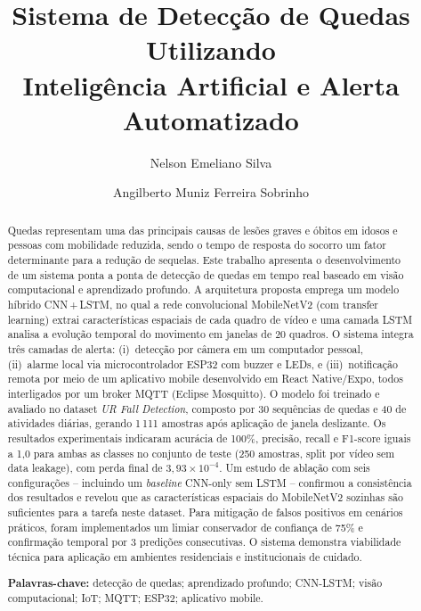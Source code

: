 \documentclass[12pt,a4paper]{article}
\title{\textbf{Sistema de Detecção de Quedas Utilizando\\
Inteligência Artificial e Alerta Automatizado}}
\author[1]{Nelson Emeliano Silva}
\author[1]{Angilberto Muniz Ferreira Sobrinho}
\affil[1]{Universidade do Estado do Amazonas (UEA), Manaus -- AM, Brasil}
\date{}
\begin{document}
\maketitle

\begin{abstract}
Quedas representam uma das principais causas de lesões graves e óbitos em idosos e pessoas com mobilidade reduzida, sendo o tempo de resposta do socorro um fator determinante para a redução de sequelas. Este trabalho apresenta o desenvolvimento de um sistema ponta a ponta de detecção de quedas em tempo real baseado em visão computacional e aprendizado profundo. A arquitetura proposta emprega um modelo híbrido CNN\,+\,LSTM, no qual a rede convolucional MobileNetV2 (com transfer learning) extrai características espaciais de cada quadro de vídeo e uma camada LSTM analisa a evolução temporal do movimento em janelas de 20 quadros. O sistema integra três camadas de alerta: (i)~detecção por câmera em um computador pessoal, (ii)~alarme local via microcontrolador ESP32 com buzzer e LEDs, e (iii)~notificação remota por meio de um aplicativo mobile desenvolvido em React Native/Expo, todos interligados por um broker MQTT (Eclipse Mosquitto). O modelo foi treinado e avaliado no dataset \textit{UR Fall Detection}, composto por 30 sequências de quedas e 40 de atividades diárias, gerando 1\,111 amostras após aplicação de janela deslizante. Os resultados experimentais indicaram acurácia de 100\%, precisão, recall e F1-score iguais a 1,0 para ambas as classes no conjunto de teste (250 amostras, split por vídeo sem data leakage), com perda final de $3{,}93 \times 10^{-4}$. Um estudo de ablação com seis configurações -- incluindo um \textit{baseline} CNN-only sem LSTM -- confirmou a consistência dos resultados e revelou que as características espaciais do MobileNetV2 sozinhas são suficientes para a tarefa neste dataset. Para mitigação de falsos positivos em cenários práticos, foram implementados um limiar conservador de confiança de 75\% e confirmação temporal por 3 predições consecutivas. O sistema demonstra viabilidade técnica para aplicação em ambientes residenciais e institucionais de cuidado.

\medskip
\noindent\textbf{Palavras-chave:} detecção de quedas; aprendizado profundo; CNN-LSTM; visão computacional; IoT; MQTT; ESP32; aplicativo mobile.
\end{abstract}
\end{document}
